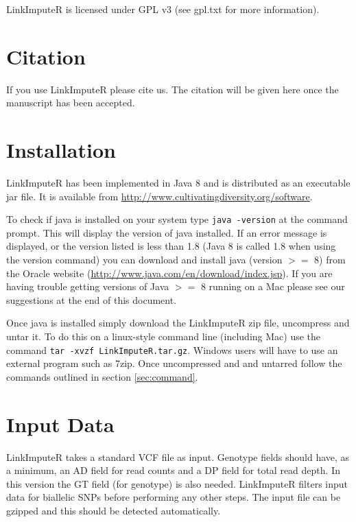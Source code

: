 \documentclass[10pt]{report}
\begin{document}
LinkImputeR is licensed under GPL v3 (see gpl.txt for more information).

\section{Citation}

If you use LinkImputeR please cite us.  The citation will be given here once the manuscript has been accepted.


\section{Installation}

LinkImputeR has been implemented in Java 8 and is distributed as an executable jar file.  It is available from \url{http://www.cultivatingdiversity.org/software}.

To check if java is installed on your system type \texttt{java -version} at the command prompt.  This will display the version of java installed.  If an error message is displayed, or the version listed is less than 1.8 (Java 8 is called 1.8 when using the version command) you can download and install java (version $>=$ 8) from the Oracle website (\url{http://www.java.com/en/download/index.jsp}).  If you are having trouble getting versions of Java $>=$ 8 running on a Mac please see our suggestions at the end of this document.

Once java is installed simply download the LinkImputeR zip file, uncompress and untar it.  To do this on a linux-style command line (including Mac) use the command \texttt{tar -xvzf LinkImputeR.tar.gz}.  Windows users will have to use an external program such as 7zip.  Once uncompressed and and untarred follow the commands outlined in section \ref{sec:command}.

\section{Input Data}

LinkImputeR takes a standard VCF file as input.  Genotype fields should have, as a minimum, an AD field for read counts and a DP field for total read depth.  In this version the GT field (for genotype) is also needed.  LinkImputeR filters input data for biallelic SNPs before performing any other steps.  The input file can be gzipped and this should be detected automatically.
\end{document}
